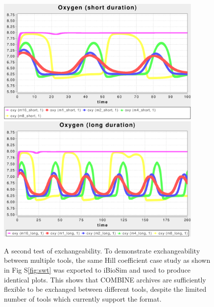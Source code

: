 \documentclass[10pt,letterpaper]{article}
\begin{document}
\begin{figure}
  \includegraphics[width=0.9\textwidth]{wolf-ibiosim-short.pdf}
  \includegraphics[width=0.9\textwidth]{wolf-ibiosim-long.pdf}
  \caption{A second test of exchangeability. To demonstrate exchangeability between multiple tools, the same Hill coefficient case study as shown in Fig S\ref{fig:swt} was exported to iBioSim \cite{myers2009ibiosim} and used to produce identical plots. This shows that COMBINE archives are sufficiently flexible to be exchanged between different tools, despite the limited number of tools which currently support the format. }
  \label{fig:ibiosim}
\end{figure}
\end{document}
